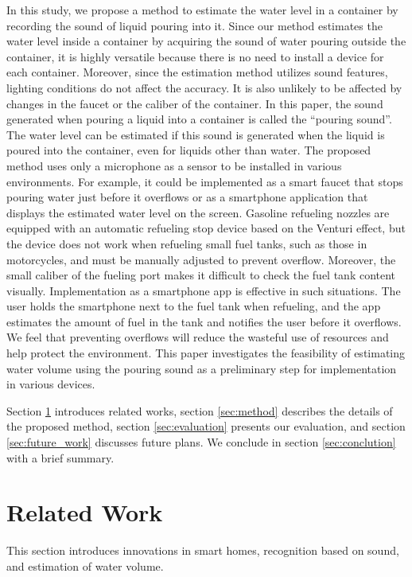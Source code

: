 \documentclass[sigconf]{acmart}
\begin{document}
In this study, we propose a method to estimate the water level in a container by recording the sound of liquid pouring into it. Since our method estimates the water level inside a container by acquiring the sound of water pouring outside the container, it is highly versatile because there is no need to install a device for each container. Moreover, since the estimation method utilizes sound features, lighting conditions do not affect the accuracy. It is also unlikely to be affected by changes in the faucet or the caliber of the container. In this paper, the sound generated when pouring a liquid into a container is called the ``pouring sound''. The water level can be estimated if this sound is generated when the liquid is poured into the container, even for liquids other than water. The proposed method uses only a microphone as a sensor to be installed in various environments. For example, it could be implemented as a smart faucet that stops pouring water just before it overflows or as a smartphone application that displays the estimated water level on the screen. Gasoline refueling nozzles are equipped with an automatic refueling stop device based on the Venturi effect, but the device does not work when refueling small fuel tanks, such as those in motorcycles, and must be manually adjusted to prevent overflow. Moreover, the small caliber of the fueling port makes it difficult to check the fuel tank content visually. Implementation as a smartphone app is effective in such situations. The user holds the smartphone next to the fuel tank when refueling, and the app estimates the amount of fuel in the tank and notifies the user before it overflows. We feel that preventing overflows will reduce the wasteful use of resources and help protect the environment. This paper investigates the feasibility of estimating water volume using the pouring sound as a preliminary step for implementation in various devices.\par

Section \ref{sec:related} introduces related works, section \ref{sec:method} describes the details of the proposed method, section \ref{sec:evaluation} presents our evaluation, and section \ref{sec:future_work} discusses future plans. We conclude in section \ref{sec:conclution} with a brief summary.



\section{Related Work}
\label{sec:related}
This section introduces innovations in smart homes, recognition based on sound, and estimation of water volume.
\end{document}
